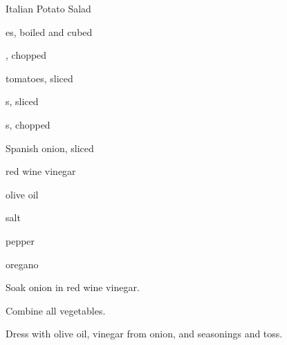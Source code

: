 \begin{recipe}{Italian Potato Salad}{}{}

\begin{ingredients}
\item {}es, boiled and cubed
\item {}, chopped
\item tomatoes, sliced
\item {}s, sliced
\item {}s, chopped
\item Spanish onion, sliced
\item red wine vinegar
\item olive oil
\item salt
\item pepper
\item oregano
\end{ingredients}

\begin{directions}
\item Soak onion in red wine vinegar.
\item Combine all vegetables.
\item Dress with olive oil, vinegar from onion, and seasonings and toss.
\end{directions}

\end{recipe}
